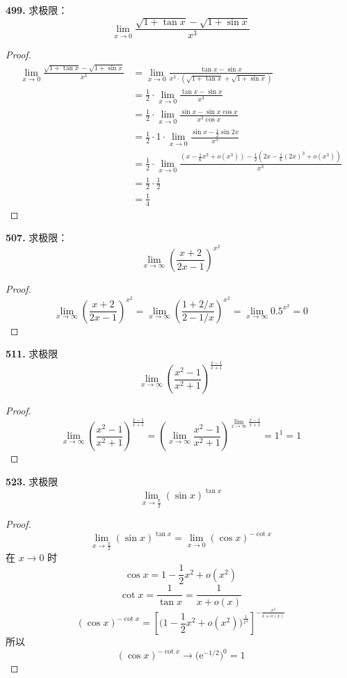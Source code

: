 \textbf{499.} 求极限：
\[\lim_{x \rightarrow 0} \frac{\sqrt{1 + \tan x} - \sqrt{1 + \sin x}}{x^3}\]
\begin{proof}
    \begin{align*}
        \lim_{x \rightarrow 0} \frac{\sqrt{1 + \tan x} - \sqrt{1 + \sin x}}{x^3} &= \lim_{x \rightarrow 0} \frac{\tan x - \sin x}{x^3 \cdot \left(\sqrt{1 + \tan x} + \sqrt{1 + \sin x}\right)}\\
        &= \frac{1}{2} \cdot \lim_{x \rightarrow 0} \frac{\tan x - \sin x}{x^3}\\
        &= \frac{1}{2} \cdot \lim_{x \rightarrow 0} \frac{\sin x - \sin x \cos x}{x^3 \cos x}\\
        &= \frac{1}{2} \cdot 1 \cdot \lim_{x \rightarrow 0} \frac{\sin x - \frac{1}{2}\sin 2x}{x^3}\\
        &= \frac{1}{2} \cdot \lim_{x \rightarrow 0} \frac{\left(x - \frac{1}{6}x^3 + o(x^3)\right) - \frac{1}{2}\left(2x - \frac{1}{6}(2x)^3 + o(x^3)\right)}{x^3}\\
        &= \frac{1}{2} \cdot \frac{1}{2}\\
        &= \frac{1}{4}
    \end{align*}
\end{proof}\vspace{9pt}

\textbf{507.} 求极限：
\[\lim_{x \rightarrow \infty} \left(\frac{x + 2}{2x - 1}\right)^{x^2}\]
\begin{proof}
    \[\lim_{x \rightarrow \infty} \left(\frac{x + 2}{2x - 1}\right)^{x^2} = \lim_{x \rightarrow \infty} \left(\frac{1 + 2/x}{2 - 1/x}\right)^{x^2} = \lim_{x \rightarrow \infty} 0.5^{x^2} = 0\]
\end{proof}\vspace{9pt}

\textbf{511.} 求极限
\[\lim_{x \rightarrow \infty} \left(\frac{x^2 - 1}{x^2 + 1}\right)^{\frac{x-1}{x+1}}\]
\begin{proof}
    \[\lim_{x \rightarrow \infty} \left(\frac{x^2 - 1}{x^2 + 1}\right)^{\frac{x-1}{x+1}} = \left(\lim_{x \rightarrow \infty} \frac{x^2 - 1}{x^2 + 1}\right)^{\lim_{x \rightarrow \infty} \frac{x-1}{x+1}} = 1^1 = 1\]
\end{proof}\vspace{9pt}

\textbf{523.} 求极限
\[\lim_{x \rightarrow \frac{\pi}{2}} (\sin x)^{\tan x}\]
\begin{proof}
    \[\lim_{x \rightarrow \frac{\pi}{2}} (\sin x)^{\tan x} = \lim_{x \rightarrow 0} (\cos x)^{-\cot x}\]
    在 $x \rightarrow 0$ 时
    \[\cos x = 1 - \frac{1}{2}x^2 + o(x^2)\]
    \[\cot x = \frac{1}{\tan x} = \frac{1}{x + o(x)}\]
    \[(\cos x)^{-\cot x} = \left[\biggl(1 - \frac{1}{2}x^2 + o(x^2)\biggr)^{\frac{1}{x^2}}\right]^{-\frac{x^2}{x + o(x)}}\]
    所以
    \[(\cos x)^{-\cot x} \rightarrow \bigl(\mathrm{e}^{-1/2}\bigr)^0 = 1\]
\end{proof}\vspace{9pt}

